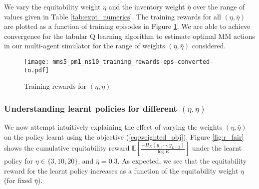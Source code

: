 \documentclass[sigconf]{acmart}
\begin{document}
We vary the equitability weight $\eta$ and the inventory weight $\bar\eta$ over the range of values given in Table \ref{tab:expt_numerics}. The training rewards for all $(\eta,\bar\eta)$ are plotted as a function of training episodes in Figure \ref{fig:training_rewards}. 
We are able to achieve convergence for the tabular Q learning algorithm to estimate optimal MM actions in our multi-agent simulator for the range of weights $(\eta,\bar\eta)$ considered. 

\begin{figure}
\centering
\texttt{[image: mms5\_pm1\_ns10\_training\_rewards-eps-converted-to.pdf]}
\caption{Training rewards for $(\eta,\bar\eta)$}
\label{fig:training_rewards}    
\end{figure}

\subsubsection{Understanding learnt policies for different $(\eta,\bar\eta)$}

We now attempt intuitively explaining the effect of varying the weights $(\eta,\bar\eta)$ on the policy learnt using the objective (\ref{eq:weighted_obj}). Figure \ref{fig:r_fair} shows the cumulative equitability reward $\mathbb{E}\left[\frac{-H_K\left(y_1,\cdots,y_{L-2}\right)}{\log K}\right]$ under the learnt policy for $\eta\in\lbrace3,10,20\rbrace$, and $\bar\eta=0.3$. As expected, we see that the equitability reward for the learnt policy increases as a function of the equitability weight $\eta$ (for fixed $\bar\eta$). 
\end{document}
